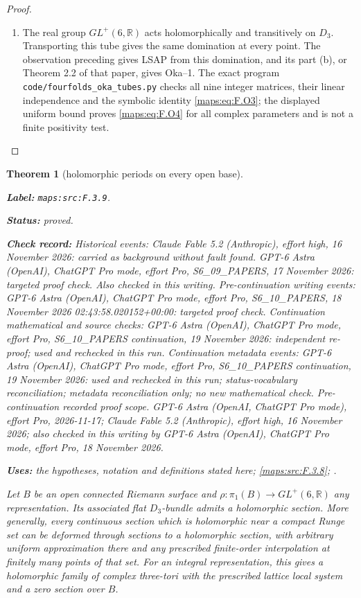 \documentclass[11pt,a4paper]{article}
\newtheorem{theorem}{Theorem}[section]
\theoremstyle{definition}
\newcommand{\StatementRecord}[4]{\par\smallskip\begingroup\upshape\raggedright\noindent\textbf{Label:} \nolinkurl{#1}.\par\noindent\textbf{Status:} #2.\par\noindent\textbf{Check record:} #3.\par\noindent\textbf{Uses:} #4.\par\endgroup\smallskip}
\begin{document}
\begin{proof}
\begin{enumerate}[label=\arabic*.]
\item The real group $GL^+(6,\mathbb R)$ acts holomorphically and
transitively on $D_3$.  Transporting this tube gives the same
domination at every point.  The observation preceding
\cite[Proposition 7.13 and preceding paragraph, pp.~23--24]{IVVOkaOneV5} gives LSAP from
this domination, and its part (b), or Theorem 2.2 of that paper,
gives Oka--1.  The exact program
\texttt{code/fourfolds\_oka\_tubes.py} checks all nine integer
matrices, their linear independence and the symbolic identity
\eqref{maps:eq:F.O3}; the displayed uniform bound proves \eqref{maps:eq:F.O4} for all complex
parameters and is not a finite positivity test.

\end{enumerate}
\end{proof}




\begin{theorem}[holomorphic periods on every open base]\label{maps:src:F.3.9}
\StatementRecord{maps:src:F.3.9}{proved}{Historical events: Claude Fable 5.2 (Anthropic), effort high, 16 November 2026: carried as background without fault found. GPT-6 Astra (OpenAI), ChatGPT Pro mode, effort Pro, S6\_09\_PAPERS, 17 November 2026: targeted proof check. Also checked in this writing. Pre-continuation writing events: GPT-6 Astra (OpenAI), ChatGPT Pro mode, effort Pro, S6\_10\_PAPERS, 18 November 2026 02:43:58.020152+00:00: targeted proof check. Continuation mathematical and source checks: GPT-6 Astra (OpenAI), ChatGPT Pro mode, effort Pro, S6\_10\_PAPERS continuation, 19 November 2026: independent re-proof; used and rechecked in this run. Continuation metadata events: GPT-6 Astra (OpenAI), ChatGPT Pro mode, effort Pro, S6\_10\_PAPERS continuation, 19 November 2026: used and rechecked in this run; status-vocabulary reconciliation; metadata reconciliation only; no new mathematical check. \emph{Pre-continuation recorded proof scope.} GPT-6 Astra (OpenAI, ChatGPT Pro mode), effort Pro, 2026-11-17; Claude Fable 5.2 (Anthropic), effort high, 16 November 2026; also checked in this writing by GPT-6 Astra (OpenAI), ChatGPT Pro mode, effort Pro, 18 November 2026}{the hypotheses, notation and definitions stated here; \cref{maps:src:F.3.8}; \cite[Proposition 7.13(d), p.~24]{IVVOkaOneV5}}


Let $B$ be an open connected Riemann surface and
$\rho:\pi_1(B)\to GL^+(6,\mathbb R)$ any representation.
Its associated flat $D_3$-bundle admits a holomorphic section.
More generally, every continuous section which is holomorphic
near a compact Runge set can be deformed through sections to a
holomorphic section, with arbitrary uniform approximation there
and any prescribed finite-order interpolation at finitely many
points of that set.  For an integral representation, this gives
a holomorphic family of complex three-tori with the prescribed
lattice local system and a zero section over $B$.

\end{theorem}
\end{document}
